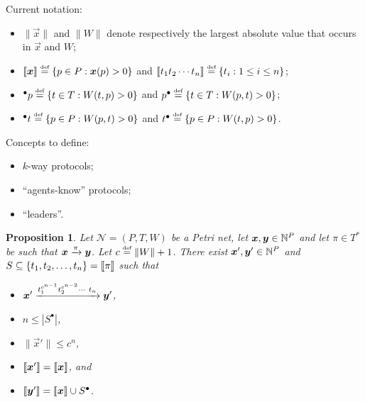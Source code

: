 \newcommand{\pn}{\mathcal{N}}
\newcommand{\norm}[1]{\lVert#1\rVert}
\newcommand{\pre}[1]{\ensuremath{{^\bullet #1}}}
\newcommand{\post}[1]{\ensuremath{{#1^\bullet}}}
\newcommand{\prepost}[1]{\ensuremath{{^\bullet {#1} ^\bullet}}}
\theoremstyle{plain}
\newtheorem{proposition}[theorem]{Proposition}

Current notation:
\begin{itemize}
  \item $\norm{\vec{x}}$ and $\norm{W}$ denote respectively the
    largest absolute value that occurs in $\vec{x}$ and $W$;

  \item $\llbracket\bm{x}\rrbracket \stackrel{\scriptscriptstyle\text{def}}{=} \{p \in P : \bm{x}(p) > 0\}$ and
    $\llbracket t_1 t_2 \cdots t_n\rrbracket \stackrel{\scriptscriptstyle\text{def}}{=} \{t_i : 1 \leq i \leq n\}$;

  \item $\pre{p} \defeq \{t \in T : W(t, p) > 0\}$ and $\post{p}
    \defeq \{t \in T : W(p, t) > 0\}$;

  \item $\pre{t} \defeq \{p \in P : W(p, t) > 0\}$ and $\post{t}
    \defeq \{p \in P : W(t, p) > 0\}$.
\end{itemize}
Concepts to define:
\begin{itemize}
\item $k$-way protocols;
\item ``agents-know'' protocols;
\item ``leaders''.
\end{itemize}

\begin{proposition}\label{prop:short:saturation}
  Let $\pn = (P, T, W)$ be a Petri net, let $\bm{x}, \bm{y} \in
  \mathbb{N}^P$ and let $\pi \in T^*$ be such that $\bm{x} \xrightarrow{\pi}
  \bm{y}$. Let $c \defeq \norm{W} + 1$. There exist $\bm{x}',
  \bm{y}' \in \mathbb{N}^P$ and $S \subseteq \{t_1, t_2, \ldots, t_n\} =
  \llbracket\pi\rrbracket$ such that
  \begin{itemize}
  \item $\bm{x}' \xrightarrow{t_1^{c^{n-1}} t_2^{c^{n-2}} \cdots\ t_n}
    \bm{y}'$,

  \item $n \leq |\post{S}|$,

  \item $\norm{\vec{x}'} \leq c^n$,

  \item $\llbracket\bm{x}'\rrbracket = \llbracket\bm{x}\rrbracket$, and 

  \item $\supp{\vec{y}'} = \supp{\vec{x}} \cup \post{S}$.
  \end{itemize}
\end{proposition}

